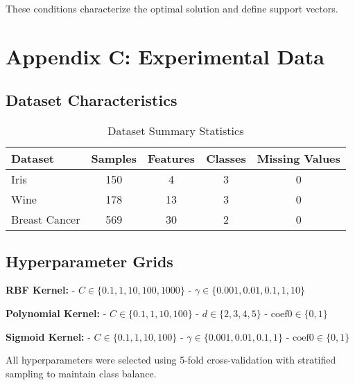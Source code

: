 \documentclass[12pt, a4paper]{article}
\begin{document}
These conditions characterize the optimal solution and define support vectors.

\section{Appendix C: Experimental Data}

\subsection{Dataset Characteristics}

\begin{table}[h]
\centering
\begin{tabular}{|l|c|c|c|c|}
\hline
Dataset & Samples & Features & Classes & Missing Values \\
\hline
Iris & 150 & 4 & 3 & 0 \\
Wine & 178 & 13 & 3 & 0 \\
Breast Cancer & 569 & 30 & 2 & 0 \\
\hline
\end{tabular}
\caption{Dataset Summary Statistics}
\end{table}

\subsection{Hyperparameter Grids}

\textbf{RBF Kernel:}
- $C \in \{0.1, 1, 10, 100, 1000\}$
- $\gamma \in \{0.001, 0.01, 0.1, 1, 10\}$

\textbf{Polynomial Kernel:}
- $C \in \{0.1, 1, 10, 100\}$
- $d \in \{2, 3, 4, 5\}$
- $\text{coef0} \in \{0, 1\}$

\textbf{Sigmoid Kernel:}
- $C \in \{0.1, 1, 10, 100\}$
- $\gamma \in \{0.001, 0.01, 0.1, 1\}$
- $\text{coef0} \in \{0, 1\}$

All hyperparameters were selected using 5-fold cross-validation with stratified sampling to maintain class balance.
\end{document}
